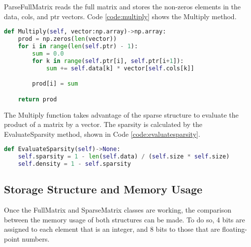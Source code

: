 ParseFullMatrix reads the full matrix and stores the non-zeros elements in the data, cols, and ptr vectors. Code \ref{code:multiply} shows the Multiply method.
\begin{lstlisting}[language=python, caption={Multiply Method}, label={code:multiply}]
def Multiply(self, vector:np.array)->np.array:
    prod = np.zeros(len(vector))
    for i in range(len(self.ptr) - 1):
        sum = 0.0
        for k in range(self.ptr[i], self.ptr[i+1]):
            sum += self.data[k] * vector[self.cols[k]]

        prod[i] = sum

    return prod
\end{lstlisting}
The Multiply function takes advantage of the sparse structure to evaluate the product of a matrix by a vector. The sparsity is calculated by the EvaluateSparsity method, shown in Code \ref{code:evaluatesparsity}.
\begin{lstlisting}[language=python, caption={EvaluateSparsity Method}, label={code:evaluatesparsity}]
def EvaluateSparsity(self)->None:
    self.sparsity = 1 - len(self.data) / (self.size * self.size)
    self.density = 1 - self.sparsity
\end{lstlisting}

\subsection{Storage Structure and Memory Usage} \label{sec:storage}
Once the FullMatrix and SparseMatrix classes are working, the comparison between the memory usage of both structures can be made. To do so, 4 bits are assigned to each element that is an integer, and 8 bits to those that are floating-point numbers. 

